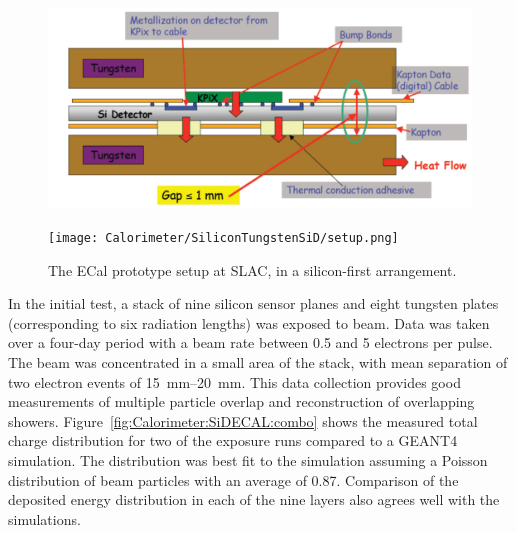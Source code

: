 \begin{figure}
	\centering
	\begin{minipage}[b]{.44\textwidth}
		\includegraphics[width=\linewidth,valign=t]{Calorimeter/SiliconTungstenSiD/gap.png}
		\caption{The 1.25 mm gap between tungsten absorber layers includes a 0.3 mm silicon sensor layer bump-bonded to the KPiX readout chip.}
		\label{fig:Calorimeter:SiDECAL:gap}
	\end{minipage}\hfill
	\begin{minipage}[b]{.44\textwidth}
		\texttt{[image: Calorimeter/SiliconTungstenSiD/setup.png]}
		\caption{The ECal prototype setup at SLAC, in a silicon-first arrangement.}
		\label{fig:Calorimeter:SiDECAL:setup}
	\end{minipage}
\end{figure}

 In the initial test, a stack of nine silicon sensor planes and eight tungsten plates (corresponding to six radiation lengths) was exposed to beam. Data was taken over a four-day period with a  beam rate between 0.5 and 5 electrons per pulse. The beam was concentrated in a small area of the stack, with mean separation of two electron events of \SIrange{15}{20}{mm}. This data collection provides good measurements of multiple particle overlap and reconstruction of overlapping showers\cite{Steinhebel:2017qze}. Figure~\ref{fig:Calorimeter:SiDECAL:combo} shows the measured total charge distribution for two of the exposure runs compared to a GEANT4 simulation. The distribution was best fit to the simulation assuming a Poisson distribution of beam particles with an average of
0.87. Comparison of the deposited energy distribution in each of the nine layers also agrees well with the simulations.

